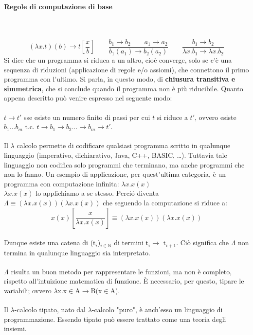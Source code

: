 \paragraph{Regole di computazione di base}\mbox{}\\\\ 
\[ (\lambda x.t)(b) \rightarrow t[\frac{x}{b}] \qquad
\frac{b_1 \rightarrow b_2	\qquad a_1 \rightarrow a_2 }{b_1(a_1) \rightarrow b_2(a_2)} \qquad 
\frac{b_1 \rightarrow b_2}{\lambda x.b_1 \rightarrow \lambda x.b_2} \]
\noindent
Si dice che un programma si riduca a un altro, cio\`e converge, solo se c'\`e una sequenza di riduzioni (applicazione di regole e/o assiomi), che connettono il primo programma con l'ultimo. Si parla, in questo modo, di \textbf{chiusura transitiva e simmetrica}, che si conclude quando il programma non \`e pi\`u riducibile. Quanto appena descritto pu\`o venire espresso nel seguente modo:\\\\ $t \rightarrow t'$ sse esiste un numero finito di passi per cui $t$ si riduce a $t'$, ovvero esiste $b_1 \dots b_m$ t.c. $t \rightarrow b_1 \rightarrow b_2 \dots \rightarrow b_m \rightarrow t'$.\\\\
Il $\lambda$ calcolo permette di codificare qualsiasi programma scritto in qualunque linguaggio (imperativo, dichiarativo, Java, C++, BASIC, \dots). Tuttavia tale linguaggio non codifica solo programmi che terminano, ma anche programmi che non lo fanno.
Un esempio di applicazione, per quest'ultima categoria, \`e un programma con computazione infinita: $\lambda x.x(x)$\\
$\lambda x.x(x)$ lo applichiamo a se stesso. Perci\'o diventa $\Lambda \equiv (\lambda x.x(x))(\lambda x.x(x))$
che seguendo la computazione si riduce a: \[x(x)[\frac{x}{\lambda x.x(x)}] \equiv (\lambda x.x(x))(\lambda x.x(x))\]\\
Dunque esiste una catena di (t$_i$)$_{i\in\mathbb{N}}$ di termini t$_i \rightarrow$ t$_{i+1}$. Ci\`o significa che
$\Lambda$ non termina in qualunque linguaggio sia interpretato.\\\\
$\Lambda$ risulta un buon metodo per rappresentare le funzioni, ma non \`e completo, rispetto all'intuizione matematica di funzione. \`E necessario, per questo, tipare le variabili; ovvero $\lambda$x.x$\in$A$\rightarrow$B(x$\in$A).\\\\
Il $\lambda$-calcolo tipato, nato dal $\lambda$-calcolo "puro", \`e anch'esso un linguaggio di programmazione. Essendo tipato pu\`o essere trattato come una teoria degli insiemi.

